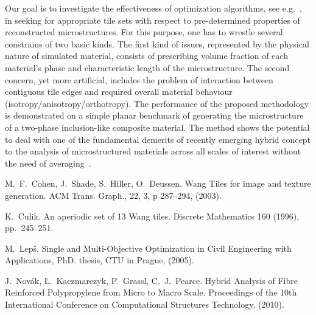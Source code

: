 Our goal is to investigate the effectiveness of optimization algorithms, see e.g.~\cite{Leps05}, in seeking for appropriate tile sets with respect to pre-determined properties of reconstructed microstructures. For this purpose, one has to wrestle several constrains of two basic kinds. The first kind of issues, represented by the physical nature of simulated material, consists of prescribing volume fraction of each material's phase and characteristic length of the microstructure. The second concern, yet more artificial, includes the problem of interaction between contiguous tile edges and required overall material behaviour (isotropy/anisotropy/orthotropy). The performance of the proposed methodology is demonstrated on a simple planar benchmark of generating the microstructure of a two-phase inclusion-like composite material. The method shows the potential to deal with one of the fundamental demerits of recently emerging hybrid concept to the analysis of microstructured materials across all scales of interest without the need of averaging~\cite{Novak10}. 


\begin{thebibliography}{10}

{\sc M.~F.~Cohen, J.~Shade, S.~Hiller, O.~Deussen}. {Wang Tiles for image and texture generation}. ACM Trans. Graph., 22, 3, p 287--294, (2003).

{\sc K.~Culik}.
{An aperiodic set of 13 Wang tiles}. Discrete Mathematics 160 (1996), pp.~245--251.

{\sc M.~Lep\v{s}}. {Single and Multi-Objective Optimization in Civil Engineering with Applications}, PhD. thesis, CTU in Prague, (2005).

{\sc J.~Nov\'{a}k, \L.~Kaczmarczyk, P.~Grassl, C.~J.~Pearce}. {Hybrid Analysis of Fibre Reinforced Polypropylene from Micro to Macro Scale}. Proceedings of the 10th International Conference on Computational Structures Technology, (2010).

\end{thebibliography}